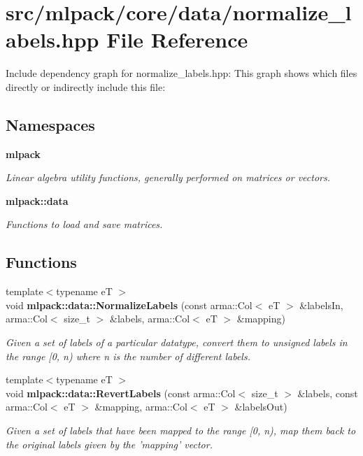\section{src/mlpack/core/data/normalize\-\_\-labels.hpp File Reference}
\label{normalize__labels_8hpp}
Include dependency graph for normalize\-\_\-labels.\-hpp\-:
This graph shows which files directly or indirectly include this file\-:
\subsection*{Namespaces}
\begin{DoxyCompactItemize}
\item 
{\bf mlpack}
\begin{DoxyCompactList}\small\item\em Linear algebra utility functions, generally performed on matrices or vectors. \end{DoxyCompactList}\item 
{\bf mlpack\-::data}
\begin{DoxyCompactList}\small\item\em Functions to load and save matrices. \end{DoxyCompactList}\end{DoxyCompactItemize}
\subsection*{Functions}
\begin{DoxyCompactItemize}
\item 
{\footnotesize template$<$typename e\-T $>$ }\\void {\bf mlpack\-::data\-::\-Normalize\-Labels} (const arma\-::\-Col$<$ e\-T $>$ \&labels\-In, arma\-::\-Col$<$ size\-\_\-t $>$ \&labels, arma\-::\-Col$<$ e\-T $>$ \&mapping)
\begin{DoxyCompactList}\small\item\em Given a set of labels of a particular datatype, convert them to unsigned labels in the range [0, n) where n is the number of different labels. \end{DoxyCompactList}\item 
{\footnotesize template$<$typename e\-T $>$ }\\void {\bf mlpack\-::data\-::\-Revert\-Labels} (const arma\-::\-Col$<$ size\-\_\-t $>$ \&labels, const arma\-::\-Col$<$ e\-T $>$ \&mapping, arma\-::\-Col$<$ e\-T $>$ \&labels\-Out)
\begin{DoxyCompactList}\small\item\em Given a set of labels that have been mapped to the range [0, n), map them back to the original labels given by the 'mapping' vector. \end{DoxyCompactList}\end{DoxyCompactItemize}


